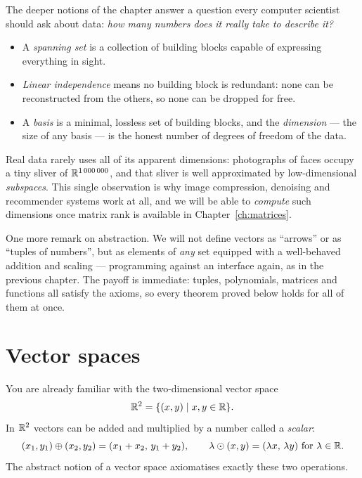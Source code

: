 The deeper notions of the chapter answer a question every computer scientist should ask about data:
\emph{how many numbers does it really take to describe it?}
\begin{itemize}
\item A \emph{spanning set} is a collection of building blocks capable of expressing everything in sight.
\item \emph{Linear independence} means no building block is redundant: none can be reconstructed from the
others, so none can be dropped for free.
\item A \emph{basis} is a minimal, lossless set of building blocks, and the \emph{dimension} — the size of
any basis — is the honest number of degrees of freedom of the data.
\end{itemize}
Real data rarely uses all of its apparent dimensions: photographs of faces occupy a tiny sliver of
$\mathbb{R}^{1\,000\,000}$, and that sliver is well approximated by low-dimensional \emph{subspaces}. This single
observation is why image compression, denoising and recommender systems work at all, and we will be able
to \emph{compute} such dimensions once matrix rank is available in Chapter~\ref{ch:matrices}.

One more remark on abstraction. We will not define vectors as ``arrows'' or as ``tuples of numbers'', but
as elements of \emph{any} set equipped with a well-behaved addition and scaling — programming against an
interface again, as in the previous chapter. The payoff is immediate: tuples, polynomials, matrices and
functions all satisfy the axioms, so every theorem proved below holds for all of them at once.

\section{Vector spaces}

You are already familiar with the two-dimensional vector space
\[
\mathbb{R}^2 = \{(x,y)\mid x,y\in \mathbb{R}\}.
\]
In $\mathbb{R}^2$ vectors can be added and multiplied by a number called a \emph{scalar}:
\[
(x_1,y_1)\oplus(x_2,y_2) = (x_1+x_2,\, y_1+y_2), \qquad
\lambda \odot (x,y) = (\lambda x,\, \lambda y) \text{ for } \lambda\in \mathbb{R}.
\]
The abstract notion of a vector space axiomatises exactly these two operations.

